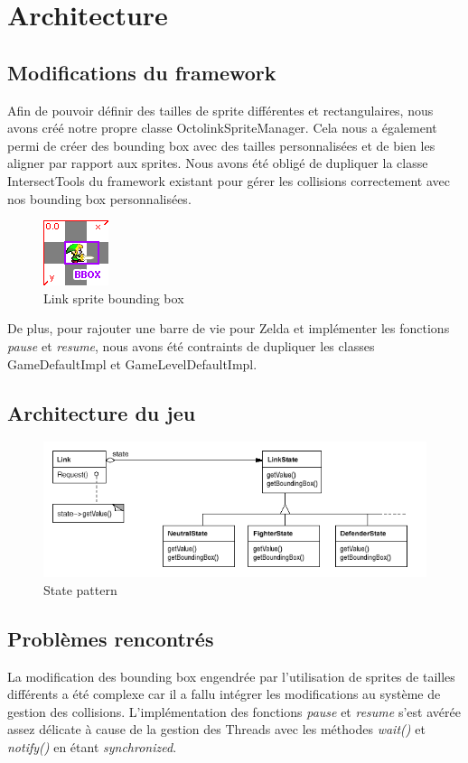 \chapter{Architecture}

\section{Modifications du framework}

Afin de pouvoir définir des tailles de sprite différentes et rectangulaires,
nous avons créé notre propre classe OctolinkSpriteManager. Cela nous a également
permi de créer des bounding box avec des tailles personnalisées et de bien les
aligner par rapport aux sprites. Nous avons été obligé de dupliquer la classe
IntersectTools du framework existant pour gérer les collisions correctement avec
nos bounding box personnalisées.

\begin{figure}[ht!]
  \center
  \includegraphics{resources/bbox.png}
  \caption{Link sprite bounding box}
  \label{fig:Link sprite bounding box}
\end{figure}

De plus, pour rajouter une barre de vie pour Zelda et implémenter les fonctions
\emph{pause} et \emph{resume}, nous avons été contraints de dupliquer les
classes GameDefaultImpl et GameLevelDefaultImpl.


\newpage
\section{Architecture du jeu}

\begin{figure}[ht!]
  \center
  \includegraphics[width=16cm,keepaspectratio]{resources/state_pattern.png}
  \caption{State pattern}
  \label{fig:State pattern}
\end{figure}


\section{Problèmes rencontrés}
La modification des bounding box engendrée par l'utilisation de sprites de
tailles différents a été complexe car il a fallu intégrer les modifications au
système de gestion des collisions.
L'implémentation des fonctions \emph{pause} et \emph{resume} s'est avérée assez
délicate à cause de la gestion des Threads avec les méthodes \emph{wait()} et
\emph{notify()} en étant \emph{synchronized}.
